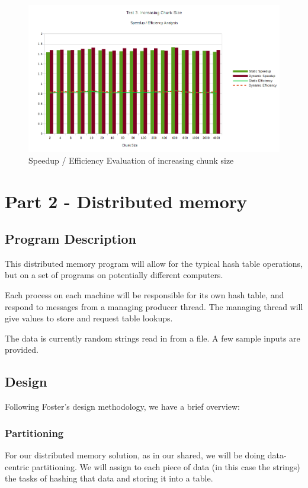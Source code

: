 \documentclass{article}
\begin{document}
\begin{figure}
  \caption{Speedup / Efficiency Evaluation of increasing chunk size}
  \centering
  \includegraphics[width=\textwidth]{chart3b}
\end{figure}


\section{Part 2 - Distributed memory}
\subsection{Program Description}
This distributed memory program will allow for the typical hash table operations, but on a set of programs on potentially different computers.

Each process on each machine will be responsible for its own hash table, and respond to messages from a managing producer thread. The managing thread will give values to store and request table lookups.

The data is currently random strings read in from a file. A few sample inputs are provided.

\subsection{Design}
Following Foster's design methodology, we have a brief overview:

\subsubsection{Partitioning}
For our distributed memory solution, as in our shared, we will be doing data-centric partitioning. We will assign to each piece of data (in this case the strings) the tasks of hashing that data and storing it into a table. 
\end{document}
